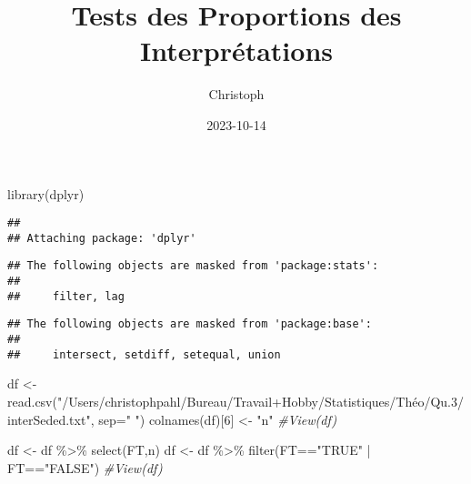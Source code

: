 \documentclass[
]{article}
\title{Tests des Proportions des Interprétations}
\author{Christoph}
\date{2023-10-14}
\newenvironment{Shaded}{\begin{snugshade}}{\end{snugshade}}
\newcommand{\AttributeTok}[1]{\textcolor[rgb]{0.77,0.63,0.00}{#1}}
\newcommand{\CommentTok}[1]{\textcolor[rgb]{0.56,0.35,0.01}{\textit{#1}}}
\newcommand{\DecValTok}[1]{\textcolor[rgb]{0.00,0.00,0.81}{#1}}
\newcommand{\DocumentationTok}[1]{\textcolor[rgb]{0.56,0.35,0.01}{\textbf{\textit{#1}}}}
\newcommand{\FunctionTok}[1]{\textcolor[rgb]{0.00,0.00,0.00}{#1}}
\newcommand{\NormalTok}[1]{#1}
\newcommand{\OtherTok}[1]{\textcolor[rgb]{0.56,0.35,0.01}{#1}}
\newcommand{\SpecialCharTok}[1]{\textcolor[rgb]{0.00,0.00,0.00}{#1}}
\newcommand{\StringTok}[1]{\textcolor[rgb]{0.31,0.60,0.02}{#1}}
\begin{document}
\maketitle

\begin{Shaded}
\begin{Highlighting}[]
\FunctionTok{library}\NormalTok{(dplyr)}
\end{Highlighting}
\end{Shaded}

\begin{verbatim}
## 
## Attaching package: 'dplyr'
\end{verbatim}

\begin{verbatim}
## The following objects are masked from 'package:stats':
## 
##     filter, lag
\end{verbatim}

\begin{verbatim}
## The following objects are masked from 'package:base':
## 
##     intersect, setdiff, setequal, union
\end{verbatim}

\begin{Shaded}
\begin{Highlighting}[]
\NormalTok{df }\OtherTok{\textless{}{-}} \FunctionTok{read.csv}\NormalTok{(}\StringTok{"/Users/christophpahl/Bureau/Travail+Hobby/Statistiques/Théo/Qu.3/interSeded.txt"}\NormalTok{, }\AttributeTok{sep=}\StringTok{" "}\NormalTok{)}
\FunctionTok{colnames}\NormalTok{(df)[}\DecValTok{6}\NormalTok{] }\OtherTok{\textless{}{-}} \StringTok{"n"}
\CommentTok{\#View(df)}

\NormalTok{df  }\OtherTok{\textless{}{-}}\NormalTok{ df }\SpecialCharTok{\%\textgreater{}\%} \FunctionTok{select}\NormalTok{(FT,n)}
\NormalTok{df  }\OtherTok{\textless{}{-}}\NormalTok{ df }\SpecialCharTok{\%\textgreater{}\%} \FunctionTok{filter}\NormalTok{(FT}\SpecialCharTok{==}\StringTok{"TRUE"} \SpecialCharTok{|}\NormalTok{ FT}\SpecialCharTok{==}\StringTok{"FALSE"}\NormalTok{)}
\CommentTok{\#View(df)}
\end{Highlighting}
\end{Shaded}

\begin{Shaded}
\end{Shaded}
\end{document}
